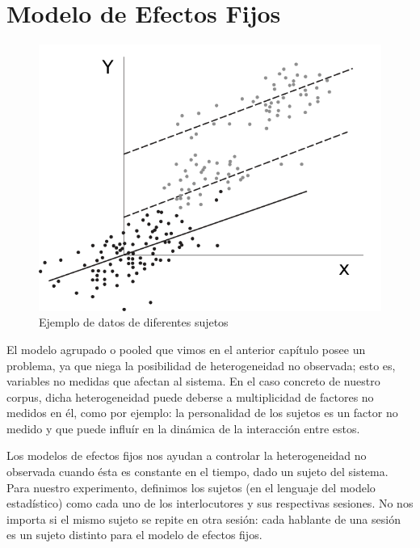 \section{Modelo de Efectos Fijos}

\begin{figure}[t]
\centering
\includegraphics[scale=1]{images/fixed_effects_example.pdf}
\caption{Ejemplo de datos de diferentes sujetos}
\label{fig:efectos_fijo}
\end{figure}



\newcommand{\slopeestim}[1] { $\estslope \sim #1$ }

El modelo agrupado o pooled que vimos en el anterior capítulo posee un problema, ya que niega la posibilidad de heterogeneidad no observada; esto es, variables no medidas que afectan al sistema. En el caso concreto de nuestro corpus, dicha heterogeneidad puede deberse a multiplicidad de factores no medidos en él, como por ejemplo: la personalidad de los sujetos es un factor no medido y que puede influír en la dinámica de la interacción entre estos.

Los modelos de efectos fijos nos ayudan a controlar la heterogeneidad no observada cuando ésta es constante en el tiempo, dado un sujeto del sistema. Para nuestro experimento, definimos los sujetos (en el lenguaje del modelo estadístico) como cada uno de los interlocutores y sus respectivas sesiones. No nos importa si el mismo sujeto se repite en otra sesión: cada hablante de una sesión es un sujeto distinto para el modelo de efectos fijos. 

